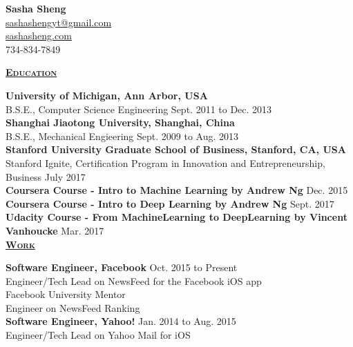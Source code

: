 \documentclass{article}
\newlength{\remaining}
\newcommand{\titleline}[1]{
\setlength{\remaining}{\textwidth-\widthof{\textsc{#1}}}
\noindent\underline{\textsc{#1}\hspace*{\remaining}}\par}
\begin{document}
    \thispagestyle{empty}
    \begin{center}
         \large{\textbf{Sasha Sheng}} \\
         \href{mailto:sashashengyt@gmail.com}{sashashengyt@gmail.com} \\
         \href{http://sashasheng.com}{sashasheng.com} \\
         734-834-7849
    \end{center}

    \titleline{\textbf{\large{Education}}}
        	\noindent\textbf{University of Michigan, Ann Arbor, USA} \\
 	 B.S.E., Computer Science Engineering \hfill Sept. 2011 to Dec. 2013 \\
	 
         \noindent\textbf{Shanghai Jiaotong University, Shanghai, China} \\
         B.S.E., Mechanical Engieering \hfill Sept. 2009 to Aug. 2013 \\
         
         \noindent\textbf{Stanford University Graduate School of Business, Stanford, CA, USA} \\
         Stanford Ignite, Certification Program in Innovation and Entrepreneurship, Business \hfill July 2017\\
         
         \noindent\textbf{Coursera Course - Intro to Machine Learning by Andrew Ng} \hfill Dec. 2015\\
         \noindent\textbf{Coursera Course - Intro to Deep Learning by Andrew Ng} \hfill Sept. 2017 \\
         \noindent\textbf{Udacity Course - From MachineLearning to DeepLearning by Vincent Vanhoucke} \hfill Mar. 2017 \\


    \titleline{\textbf{\large{Work}}}
        	\noindent\textbf{Software Engineer, Facebook} \hfill Oct. 2015 to Present \\
	Engineer/Tech Lead on NewsFeed for the Facebook iOS app \\
	Facebook University Mentor \\
	Engineer on NewsFeed Ranking \\
	
    	\noindent\textbf{Software Engineer, Yahoo!} \hfill Jan. 2014 to Aug. 2015 \\
        Engineer/Tech Lead on Yahoo Mail for iOS \\
 
\end{document}
